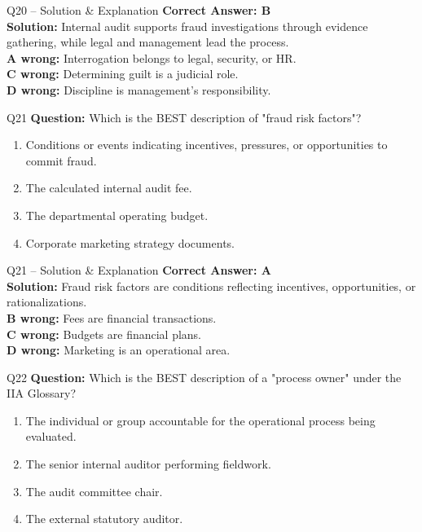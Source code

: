 \documentclass[aspectratio=169,10pt]{beamer}
\begin{document}
	\begin{frame}[t]{Q20 -- Solution \& Explanation}
		\small
		\textbf{Correct Answer: B} \\[4pt]
		\textbf{Solution:} Internal audit supports fraud investigations through evidence gathering, while legal and management lead the process. \\[4pt]
		\textbf{A wrong:} Interrogation belongs to legal, security, or HR. \\[2pt]
		\textbf{C wrong:} Determining guilt is a judicial role. \\[2pt]
		\textbf{D wrong:} Discipline is management's responsibility.
	\end{frame}
	
	\begin{frame}[t]{Q21}
		\small
		\textbf{Question:} Which is the BEST description of "fraud risk factors"?
		\begin{enumerate}[label=\Alph*.,itemsep=1pt,topsep=2pt]
			\item Conditions or events indicating incentives, pressures, or opportunities to commit fraud.
			\item The calculated internal audit fee.
			\item The departmental operating budget.
			\item Corporate marketing strategy documents.
		\end{enumerate}
	\end{frame}
	
	\begin{frame}[t]{Q21 -- Solution \& Explanation}
		\small
		\textbf{Correct Answer: A} \\[4pt]
		\textbf{Solution:} Fraud risk factors are conditions reflecting incentives, opportunities, or rationalizations. \\[4pt]
		\textbf{B wrong:} Fees are financial transactions. \\[2pt]
		\textbf{C wrong:} Budgets are financial plans. \\[2pt]
		\textbf{D wrong:} Marketing is an operational area.
	\end{frame}
	
	\begin{frame}[t]{Q22}
		\small
		\textbf{Question:} Which is the BEST description of a "process owner" under the IIA Glossary?
		\begin{enumerate}[label=\Alph*.,itemsep=1pt,topsep=2pt]
			\item The individual or group accountable for the operational process being evaluated.
			\item The senior internal auditor performing fieldwork.
			\item The audit committee chair.
			\item The external statutory auditor.
		\end{enumerate}
	\end{frame}
	
\end{document}
